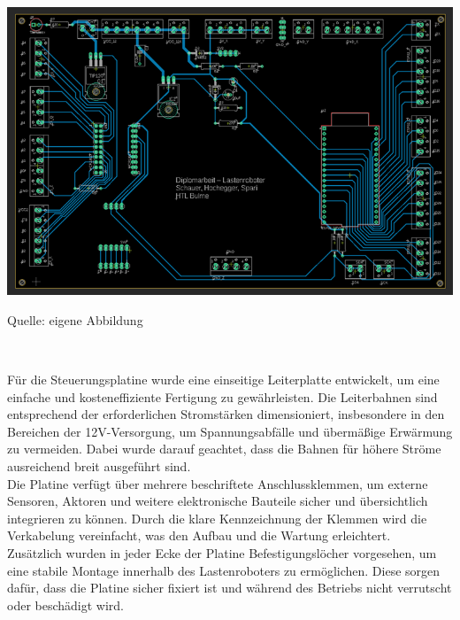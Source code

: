 \documentclass[ngerman,12pt,a4paper]{article}
\begin{document}
	\begin{center} 
		\begin{minipage}[t]{\textwidth}
			\includegraphics{Pictures/PCB}
			\label{fig:i2c-anschlüsse}
			\vspace{-10pt}
			\begin{center}
				\par\small Quelle: eigene Abbildung
			\end{center}
		\end{minipage} \\[0.75cm]
	\end{center}
	Für die Steuerungsplatine wurde eine einseitige Leiterplatte entwickelt, um eine einfache und kosteneffiziente Fertigung zu gewährleisten. Die Leiterbahnen sind entsprechend der erforderlichen Stromstärken dimensioniert, insbesondere in den Bereichen der 12V-Versorgung, um Spannungsabfälle und übermäßige Erwärmung zu vermeiden. Dabei wurde darauf geachtet, dass die Bahnen für höhere Ströme ausreichend breit ausgeführt sind.\\[0.75cm]
	Die Platine verfügt über mehrere beschriftete Anschlussklemmen, um externe Sensoren, Aktoren und weitere elektronische Bauteile sicher und übersichtlich integrieren zu können. Durch die klare Kennzeichnung der Klemmen wird die Verkabelung vereinfacht, was den Aufbau und die Wartung erleichtert.\\[0.75cm]
	Zusätzlich wurden in jeder Ecke der Platine Befestigungslöcher vorgesehen, um eine stabile Montage innerhalb des Lastenroboters zu ermöglichen. Diese sorgen dafür, dass die Platine sicher fixiert ist und während des Betriebs nicht verrutscht oder beschädigt wird.
	
\end{document}
